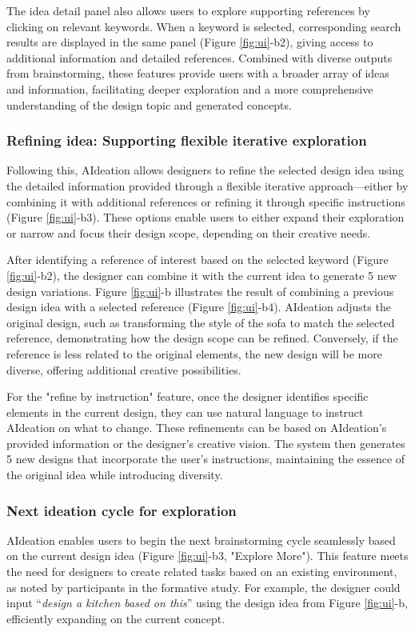 The idea detail panel also allows users to explore supporting references by clicking on relevant keywords. When a keyword is selected, corresponding search results are displayed in the same panel (Figure \ref{fig:ui}-b2), giving access to additional information and detailed references. Combined with diverse outputs from brainstorming, these features provide users with a broader array of ideas and information, facilitating deeper exploration and a more comprehensive understanding of the design topic and generated concepts.


\subsubsection{Refining idea: Supporting flexible iterative exploration}
Following this, AIdeation allows designers to refine the selected design idea using the detailed information provided through a flexible iterative approach—either by combining it with additional references or refining it through specific instructions (Figure \ref{fig:ui}-b3). These options enable users to either expand their exploration or narrow and focus their design scope, depending on their creative needs. 

After identifying a reference of interest based on the selected keyword (Figure \ref{fig:ui}-b2), the designer can combine it with the current idea to generate 5 new design variations. Figure \ref{fig:ui}-b illustrates the result of combining a previous design idea with a selected reference (Figure \ref{fig:ui}-b4). AIdeation adjusts the original design, such as transforming the style of the sofa to match the selected reference, demonstrating how the design scope can be refined. Conversely, if the reference is less related to the original elements, the new design will be more diverse, offering additional creative possibilities.

For the "refine by instruction" feature, once the designer identifies specific elements in the current design, they can use natural language to instruct AIdeation on what to change. These refinements can be based on AIdeation's provided information or the designer’s creative vision. The system then generates 5 new designs that incorporate the user’s instructions, maintaining the essence of the original idea while introducing diversity.

\subsubsection{Next ideation cycle for exploration}
AIdeation enables users to begin the next brainstorming cycle seamlessly based on the current design idea (Figure \ref{fig:ui}-b3, "Explore More"). This feature meets the need for designers to create related tasks based on an existing environment, as noted by participants in the formative study. For example, the designer could input “\textit{design a kitchen based on this}” using the design idea from Figure \ref{fig:ui}-b, efficiently expanding on the current concept.

